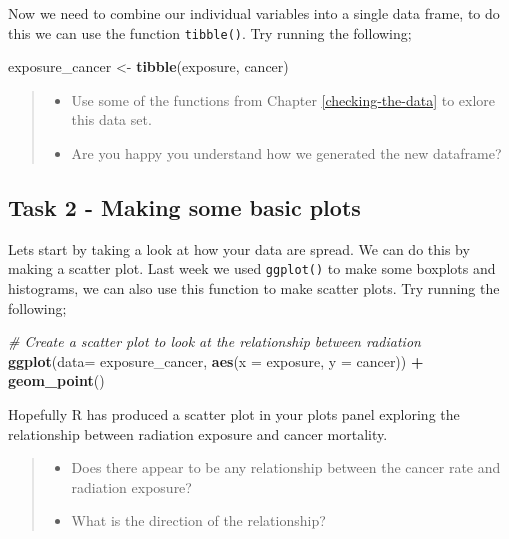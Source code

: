 \documentclass[
]{book}
\newenvironment{Shaded}{\begin{snugshade}}{\end{snugshade}}
\newcommand{\AttributeTok}[1]{\textcolor[rgb]{0.13,0.29,0.53}{#1}}
\newcommand{\CommentTok}[1]{\textcolor[rgb]{0.56,0.35,0.01}{\textit{#1}}}
\newcommand{\FunctionTok}[1]{\textcolor[rgb]{0.13,0.29,0.53}{\textbf{#1}}}
\newcommand{\NormalTok}[1]{#1}
\newcommand{\OtherTok}[1]{\textcolor[rgb]{0.56,0.35,0.01}{#1}}
\newcommand{\SpecialCharTok}[1]{\textcolor[rgb]{0.81,0.36,0.00}{\textbf{#1}}}
\providecommand{\tightlist}{%
  \setlength{\itemsep}{0pt}\setlength{\parskip}{0pt}}
\begin{document}
Now we need to combine our individual variables into a single data frame, to do this we can use the function \texttt{tibble()}. Try running the following;

\begin{Shaded}
\begin{Highlighting}[]
\NormalTok{exposure\_cancer }\OtherTok{\textless{}{-}} \FunctionTok{tibble}\NormalTok{(exposure, cancer)}
\end{Highlighting}
\end{Shaded}

\begin{quote}
\begin{itemize}
\tightlist
\item
  Use some of the functions from Chapter \ref{checking-the-data} to exlore this data set.
\item
  Are you happy you understand how we generated the new dataframe?
\end{itemize}
\end{quote}

\hypertarget{c6t2}{%
\subsection{Task 2 - Making some basic plots}\label{c6t2}}

Lets start by taking a look at how your data are spread. We can do this by making a scatter plot. Last week we used \texttt{ggplot()} to make some boxplots and histograms, we can also use this function to make scatter plots. Try running the following;

\begin{Shaded}
\begin{Highlighting}[]
\CommentTok{\# Create a scatter plot to look at the relationship between radiation }
\FunctionTok{ggplot}\NormalTok{(}\AttributeTok{data=}\NormalTok{ exposure\_cancer, }\FunctionTok{aes}\NormalTok{(}\AttributeTok{x =}\NormalTok{ exposure, }\AttributeTok{y =}\NormalTok{ cancer)) }\SpecialCharTok{+}
  \FunctionTok{geom\_point}\NormalTok{()}
\end{Highlighting}
\end{Shaded}

Hopefully R has produced a scatter plot in your plots panel exploring the relationship between radiation exposure and cancer mortality.

\begin{quote}
\begin{itemize}
\tightlist
\item
  Does there appear to be any relationship between the cancer rate and radiation exposure?
\item
  What is the direction of the relationship?
\end{itemize}
\end{quote}
\end{document}
